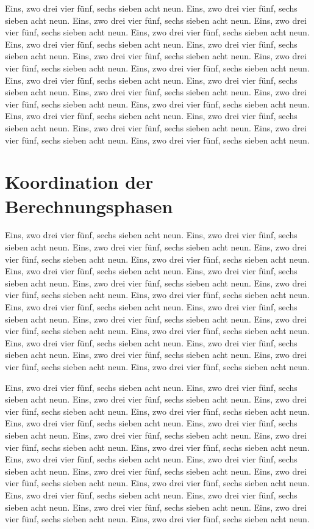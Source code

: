 \documentclass[12pt,a4paper]{article}
\begin{document}
Eins, zwo drei vier fünf, sechs sieben acht neun.
Eins, zwo drei vier fünf, sechs sieben acht neun.
Eins, zwo drei vier fünf, sechs sieben acht neun.
Eins, zwo drei vier fünf, sechs sieben acht neun.
Eins, zwo drei vier fünf, sechs sieben acht neun.
Eins, zwo drei vier fünf, sechs sieben acht neun.
Eins, zwo drei vier fünf, sechs sieben acht neun.
Eins, zwo drei vier fünf, sechs sieben acht neun.
Eins, zwo drei vier fünf, sechs sieben acht neun.
Eins, zwo drei vier fünf, sechs sieben acht neun.
Eins, zwo drei vier fünf, sechs sieben acht neun.
Eins, zwo drei vier fünf, sechs sieben acht neun.
Eins, zwo drei vier fünf, sechs sieben acht neun.
Eins, zwo drei vier fünf, sechs sieben acht neun.
Eins, zwo drei vier fünf, sechs sieben acht neun.
Eins, zwo drei vier fünf, sechs sieben acht neun.
Eins, zwo drei vier fünf, sechs sieben acht neun.
Eins, zwo drei vier fünf, sechs sieben acht neun.
Eins, zwo drei vier fünf, sechs sieben acht neun.
Eins, zwo drei vier fünf, sechs sieben acht neun.

\section{Koordination der Berechnungsphasen}

Eins, zwo drei vier fünf, sechs sieben acht neun.
Eins, zwo drei vier fünf, sechs sieben acht neun.
Eins, zwo drei vier fünf, sechs sieben acht neun.
Eins, zwo drei vier fünf, sechs sieben acht neun.
Eins, zwo drei vier fünf, sechs sieben acht neun.
Eins, zwo drei vier fünf, sechs sieben acht neun.
Eins, zwo drei vier fünf, sechs sieben acht neun.
Eins, zwo drei vier fünf, sechs sieben acht neun.
Eins, zwo drei vier fünf, sechs sieben acht neun.
Eins, zwo drei vier fünf, sechs sieben acht neun.
Eins, zwo drei vier fünf, sechs sieben acht neun.
Eins, zwo drei vier fünf, sechs sieben acht neun.
Eins, zwo drei vier fünf, sechs sieben acht neun.
Eins, zwo drei vier fünf, sechs sieben acht neun.
Eins, zwo drei vier fünf, sechs sieben acht neun.
Eins, zwo drei vier fünf, sechs sieben acht neun.
Eins, zwo drei vier fünf, sechs sieben acht neun.
Eins, zwo drei vier fünf, sechs sieben acht neun.
Eins, zwo drei vier fünf, sechs sieben acht neun.
Eins, zwo drei vier fünf, sechs sieben acht neun.

Eins, zwo drei vier fünf, sechs sieben acht neun.
Eins, zwo drei vier fünf, sechs sieben acht neun.
Eins, zwo drei vier fünf, sechs sieben acht neun.
Eins, zwo drei vier fünf, sechs sieben acht neun.
Eins, zwo drei vier fünf, sechs sieben acht neun.
Eins, zwo drei vier fünf, sechs sieben acht neun.
Eins, zwo drei vier fünf, sechs sieben acht neun.
Eins, zwo drei vier fünf, sechs sieben acht neun.
Eins, zwo drei vier fünf, sechs sieben acht neun.
Eins, zwo drei vier fünf, sechs sieben acht neun.
Eins, zwo drei vier fünf, sechs sieben acht neun.
Eins, zwo drei vier fünf, sechs sieben acht neun.
Eins, zwo drei vier fünf, sechs sieben acht neun.
Eins, zwo drei vier fünf, sechs sieben acht neun.
Eins, zwo drei vier fünf, sechs sieben acht neun.
Eins, zwo drei vier fünf, sechs sieben acht neun.
Eins, zwo drei vier fünf, sechs sieben acht neun.
Eins, zwo drei vier fünf, sechs sieben acht neun.
Eins, zwo drei vier fünf, sechs sieben acht neun.
Eins, zwo drei vier fünf, sechs sieben acht neun.
\end{document}
